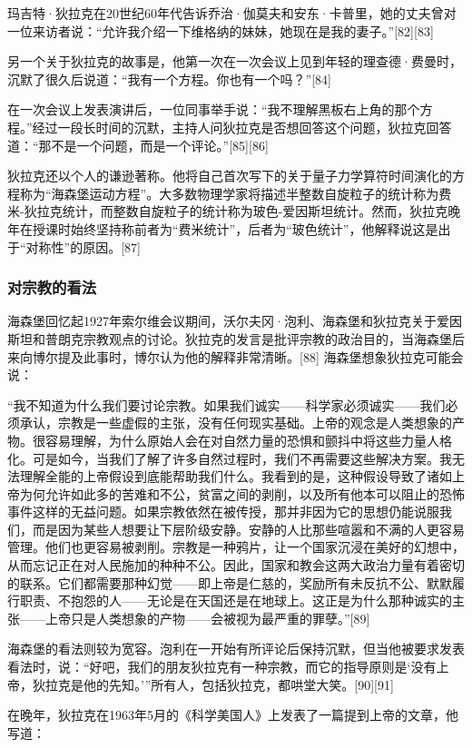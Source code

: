 玛吉特·狄拉克在20世纪60年代告诉乔治·伽莫夫和安东·卡普里，她的丈夫曾对一位来访者说：“允许我介绍一下维格纳的妹妹，她现在是我的妻子。”[82][83]  

另一个关于狄拉克的故事是，他第一次在一次会议上见到年轻的理查德·费曼时，沉默了很久后说道：“我有一个方程。你也有一个吗？”[84]  

在一次会议上发表演讲后，一位同事举手说：“我不理解黑板右上角的那个方程。”经过一段长时间的沉默，主持人问狄拉克是否想回答这个问题，狄拉克回答道：“那不是一个问题，而是一个评论。”[85][86]  

狄拉克还以个人的谦逊著称。他将自己首次写下的关于量子力学算符时间演化的方程称为“海森堡运动方程”。大多数物理学家将描述半整数自旋粒子的统计称为费米-狄拉克统计，而整数自旋粒子的统计称为玻色-爱因斯坦统计。然而，狄拉克晚年在授课时始终坚持称前者为“费米统计”，后者为“玻色统计”，他解释说这是出于“对称性”的原因。[87]
\subsubsection{对宗教的看法}  
海森堡回忆起1927年索尔维会议期间，沃尔夫冈·泡利、海森堡和狄拉克关于爱因斯坦和普朗克宗教观点的讨论。狄拉克的发言是批评宗教的政治目的，当海森堡后来向博尔提及此事时，博尔认为他的解释非常清晰。[88] 海森堡想象狄拉克可能会说：

“我不知道为什么我们要讨论宗教。如果我们诚实——科学家必须诚实——我们必须承认，宗教是一些虚假的主张，没有任何现实基础。上帝的观念是人类想象的产物。很容易理解，为什么原始人会在对自然力量的恐惧和颤抖中将这些力量人格化。可是如今，当我们了解了许多自然过程时，我们不再需要这些解决方案。我无法理解全能的上帝假设到底能帮助我们什么。我看到的是，这种假设导致了诸如上帝为何允许如此多的苦难和不公，贫富之间的剥削，以及所有他本可以阻止的恐怖事件这样的无益问题。如果宗教依然在被传授，那并非因为它的思想仍能说服我们，而是因为某些人想要让下层阶级安静。安静的人比那些喧嚣和不满的人更容易管理。他们也更容易被剥削。宗教是一种鸦片，让一个国家沉浸在美好的幻想中，从而忘记正在对人民施加的种种不公。因此，国家和教会这两大政治力量有着密切的联系。它们都需要那种幻觉——即上帝是仁慈的，奖励所有未反抗不公、默默履行职责、不抱怨的人——无论是在天国还是在地球上。这正是为什么那种诚实的主张——上帝只是人类想象的产物——会被视为最严重的罪孽。”[89]  

海森堡的看法则较为宽容。泡利在一开始有所评论后保持沉默，但当他被要求发表看法时，说：“好吧，我们的朋友狄拉克有一种宗教，而它的指导原则是‘没有上帝，狄拉克是他的先知。’”所有人，包括狄拉克，都哄堂大笑。[90][91]

在晚年，狄拉克在1963年5月的《科学美国人》上发表了一篇提到上帝的文章，他写道：

